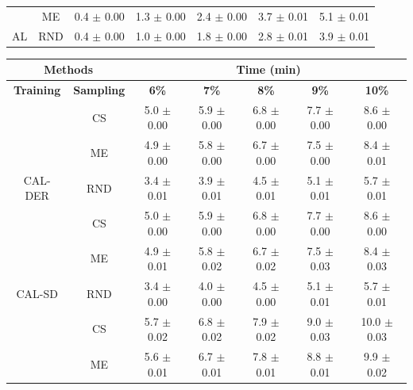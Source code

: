 \begin{table}[htbp]
\begin{tabular*}{\linewidth}{c|c|@{\extracolsep{\fill}}ccccc}
 & ME & 0.4 $\pm$ {\small 0.00} & 1.3 $\pm$ {\small 0.00} & 2.4 $\pm$ {\small 0.00} & 3.7 $\pm$ {\small 0.01} & 5.1 $\pm$ {\small 0.01}\\

\multirow{-3}{*}{\raggedright\arraybackslash AL} & RND & 0.4 $\pm$ {\small 0.00} & 1.0 $\pm$ {\small 0.00} & 1.8 $\pm$ {\small 0.00} & 2.8 $\pm$ {\small 0.01} & 3.9 $\pm$ {\small 0.01}\\
\bottomrule
\end{tabular*}
\vspace{0.5em}

\begin{tabular*}{\linewidth}{c|c|@{\extracolsep{\fill}}ccccc}
\toprule
\multicolumn{2}{c|}{\textbf{Methods}} & \multicolumn{5}{c}{\textbf{Time (min)}} \\
\midrule
\textbf{Training} & \textbf{Sampling} & \textbf{6\%} & \textbf{7\%} & \textbf{8\%} & \textbf{9\%} & \textbf{10\%}\\
\midrule
 & CS & 5.0 $\pm$ {\small 0.00} & 5.9 $\pm$ {\small 0.00} & 6.8 $\pm$ {\small 0.00} & 7.7 $\pm$ {\small 0.00} & 8.6 $\pm$ {\small 0.00}\\

 & ME & 4.9 $\pm$ {\small 0.00} & 5.8 $\pm$ {\small 0.00} & 6.7 $\pm$ {\small 0.00} & 7.5 $\pm$ {\small 0.00} & 8.4 $\pm$ {\small 0.01}\\

\multirow{-3}{*}{\raggedright\arraybackslash CAL-DER} & RND & 3.4 $\pm$ {\small 0.01} & 3.9 $\pm$ {\small 0.01} & 4.5 $\pm$ {\small 0.01} & 5.1 $\pm$ {\small 0.01} & 5.7 $\pm$ {\small 0.01}\\
\midrule
 & CS & 5.0 $\pm$ {\small 0.00} & 5.9 $\pm$ {\small 0.00} & 6.8 $\pm$ {\small 0.00} & 7.7 $\pm$ {\small 0.00} & 8.6 $\pm$ {\small 0.00}\\

 & ME & 4.9 $\pm$ {\small 0.01} & 5.8 $\pm$ {\small 0.02} & 6.7 $\pm$ {\small 0.02} & 7.5 $\pm$ {\small 0.03} & 8.4 $\pm$ {\small 0.03}\\

\multirow{-3}{*}{\raggedright\arraybackslash CAL-SD} & RND & 3.4 $\pm$ {\small 0.00} & 4.0 $\pm$ {\small 0.00} & 4.5 $\pm$ {\small 0.00} & 5.1 $\pm$ {\small 0.01} & 5.7 $\pm$ {\small 0.01}\\
\midrule
 & CS & 5.7 $\pm$ {\small 0.02} & 6.8 $\pm$ {\small 0.02} & 7.9 $\pm$ {\small 0.02} & 9.0 $\pm$ {\small 0.03} & 10.0 $\pm$ {\small 0.03}\\

 & ME & 5.6 $\pm$ {\small 0.01} & 6.7 $\pm$ {\small 0.01} & 7.8 $\pm$ {\small 0.01} & 8.8 $\pm$ {\small 0.01} & 9.9 $\pm$ {\small 0.02}\\


\end{tabular*}
\end{table}
